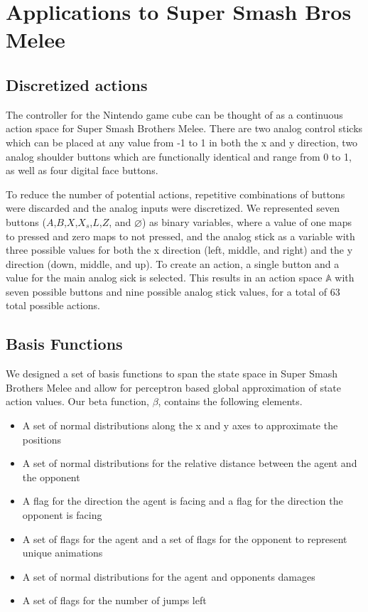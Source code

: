 \section{Applications to Super Smash Bros Melee}

\subsection{Discretized actions}
The controller for the Nintendo game cube can be thought of as a continuous action space for Super Smash Brothers Melee. There are two analog control sticks which can be placed at any value from -1 to 1 in both the x and y direction, two analog shoulder buttons which are functionally identical and range from 0 to 1, as well as four digital face buttons. 

To reduce the number of potential actions, repetitive combinations of buttons were discarded and the analog inputs were discretized. We represented seven buttons ($A$,$B$,$X$,$X_{s}$,$L$,$Z$, and $\varnothing$) as binary variables, where a value of one maps to pressed and zero maps to not pressed, and the analog stick as a variable with three possible values for both the x direction (left, middle, and right) and the y direction (down, middle, and up). To create an action, a single button and a value for the main analog sick is selected. This results in an action space $\mathbb{A}$ with seven possible buttons and nine possible analog stick values, for a total of 63 total possible actions.

\subsection{Basis Functions}
We designed a set of basis functions to span the state space in Super Smash Brothers Melee and allow for perceptron based global approximation of state action values. Our beta function, $\beta$, contains the following elements.

\begin{itemize}
\item A set of normal distributions along the x and y axes to approximate the positions
\item A set of normal distributions for the relative distance between the agent and the opponent
\item A flag for the direction the agent is facing and a flag for the direction the opponent is facing
\item A set of flags for the agent and a set of flags for the opponent to represent unique animations
\item A set of normal distributions for the agent and opponents damages
\item A set of flags for the number of jumps left
\end{itemize}

